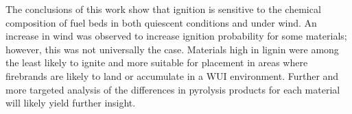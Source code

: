     The conclusions of this work show that ignition is sensitive to the chemical composition of fuel beds in both quiescent conditions and under wind. An increase in wind was observed to increase ignition probability for some materials; however, this was not universally the case. Materials high in lignin were among the least likely to ignite and more suitable for placement in areas where firebrands are likely to land or accumulate in a WUI environment. Further and more targeted analysis of the differences in pyrolysis products for each material will likely yield further insight. 

    

    
   